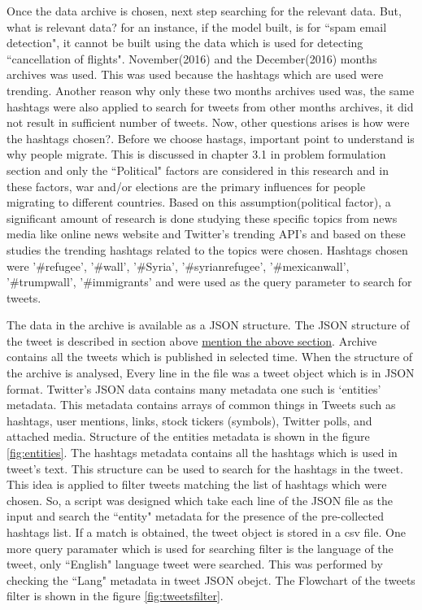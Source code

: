 Once the data archive is chosen, next step searching for the relevant data. But, what is relevant data? for an instance, if the model built, is for ``spam email detection", it cannot be built using the data which is used for detecting ``cancellation of flights". November(2016) and the December(2016) months archives was used. This was used because the hashtags which are used were trending. Another reason why only these  two months archives used was, the same hashtags were also applied to search for tweets from other months archives, it did not result in sufficient number of tweets. Now, other questions arises is how were the hashtags chosen?. Before we choose hastags, important point to understand is why people migrate. This is discussed in chapter 3.1 in problem formulation section and only the ``Political" factors are considered in this research and in these factors, war and/or elections are the primary influences for people migrating to different countries. Based on this assumption(political factor), a significant amount of research is done studying these specific topics from news media like online news website and Twitter's trending API's and based on these studies the trending hashtags related to the topics were chosen. Hashtags chosen were ’\#refugee’, ’\#wall’, ’\#Syria’, ’\#syrianrefugee’, ’\#mexicanwall’, ’\#trumpwall’, ’\#immigrants’ and were used as the query parameter to search for tweets. 

The data in the archive is available as a JSON structure. The JSON structure of the tweet is described in section above \underline{mention the above section}. Archive contains all the tweets which is published in selected time. When the structure of the archive is analysed, Every line in the file was a tweet object which is in JSON format. Twitter's JSON data contains many metadata one such is `entities' metadata. This metadata contains arrays of common things in Tweets such as hashtags, user mentions, links, stock tickers (symbols), Twitter polls, and attached media. Structure of the entities metadata is shown in the figure \ref{fig:entities}. The hashtags metadata contains all the hashtags which is used in tweet's text. This structure can be used to search for the hashtags in the tweet. This idea is applied to filter tweets matching the list of hashtags which were chosen. So, a script was designed which take each line of the JSON file as the input and search the ``entity" metadata for the presence of the pre-collected hashtags list. If a match is obtained, the tweet object is stored in a csv file. One more query paramater which is used for searching filter is the language of the tweet, only ``English" language tweet were searched. This was performed by checking the ``Lang" metadata in tweet JSON obejct. The Flowchart of the tweets filter is shown in the figure \ref{fig:tweetsfilter}.


